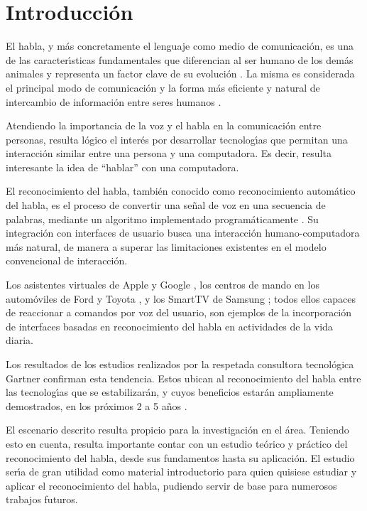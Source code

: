 \chapter{Introducci\'on}
\label{sec:intro}

El habla, y m\'as concretamente el lenguaje como medio de comunicaci\'on, es una
de las caracter{\'\i}sticas fundamentales que diferencian al ser humano de los dem\'as
animales y representa un factor clave de su evoluci\'on \cite{SchepartzLanguage1993}. La misma es considerada
el principal modo de comunicaci\'on y la forma m\'as eficiente y natural de intercambio 
de informaci\'on entre seres humanos \cite{GaikwadAReview2010}.

Atendiendo la importancia de la voz y el habla en la comunicaci\'on entre personas,
resulta l\'ogico el inter\'es por desarrollar tecnolog{\'\i}as que permitan una interacci\'on
similar entre una persona y una computadora. Es decir, resulta interesante la idea 
de ``hablar'' con una computadora.

El reconocimiento del habla, tambi\'en conocido como reconocimiento autom\'atico del habla,
es el proceso de convertir una se\~nal de voz en una secuencia de
palabras, mediante un algoritmo implementado program\'aticamente \cite{JaisalAReview2012}. 
Su integraci\'on con interfaces de usuario busca una interacci\'on humano-computadora m\'as
natural, de manera a superar las limitaciones existentes en el modelo convencional
de interacci\'on.

Los asistentes virtuales de Apple \cite{AppleSiri} y Google \cite{GoogleNow}, 
los centros de mando en los autom\'oviles de Ford \cite{FordSync} y Toyota \cite{ToyotaEntune},
y los SmartTV de Samsung \cite{SamsungVoiceControl}; todos ellos capaces de reaccionar a 
comandos por voz del usuario, son ejemplos de la incorporaci\'on de interfaces basadas 
en reconocimiento del habla en actividades de la vida diaria.

Los resultados de los estudios realizados por la respetada consultora tecnol\'ogica
Gartner confirman esta tendencia. Estos ubican al reconocimiento del habla entre
las tecnolog{\'\i}as que se estabilizar\'an, y cuyos beneficios estar\'an ampliamente
demostrados, en los pr\'oximos 2 a 5 a\~nos \cite{Gartner2013}. 

El escenario descrito resulta propicio para la investigaci\'on en el \'area.
Teniendo esto en cuenta, resulta importante contar con un estudio te\'orico
y pr\'actico del reconocimiento del habla, desde sus fundamentos hasta su
aplicaci\'on. El estudio ser{\'\i}a de gran utilidad como material introductorio
para quien quisiese estudiar y aplicar el reconocimiento del habla, pudiendo
servir de base para numerosos trabajos futuros.

